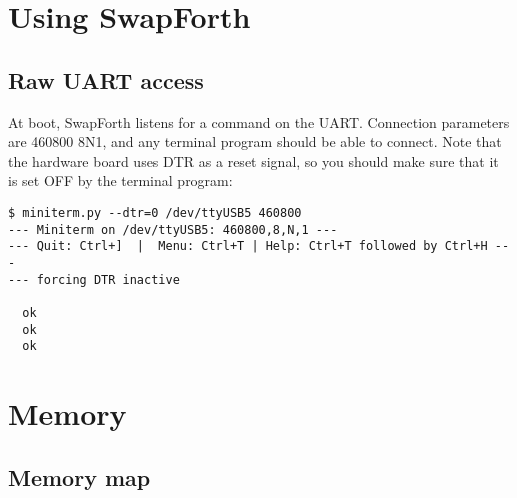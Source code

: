 \chapter{Using SwapForth}

\section{Raw UART access}

At boot, SwapForth listens for a command on the UART. 
Connection parameters are 460800 8N1, and any terminal program should be able to connect.
 
Note that the hardware board uses DTR as a reset signal, so you should make sure that it is set OFF by the terminal program:

\begin{verbatim}
$ miniterm.py --dtr=0 /dev/ttyUSB5 460800
--- Miniterm on /dev/ttyUSB5: 460800,8,N,1 ---
--- Quit: Ctrl+]  |  Menu: Ctrl+T | Help: Ctrl+T followed by Ctrl+H ---
--- forcing DTR inactive

  ok
  ok
  ok
\end{verbatim}


% 
% 



\chapter{Memory}

\section{Memory map}

